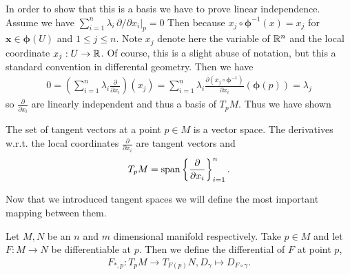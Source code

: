 \documentclass[../master_thesis.tex]{subfiles}
\begin{document}
In order to show that this is a basis we have to prove linear independence.
Assume we have $\sum_{i=1}^n \lambda_i \, \partial/\partial x_i|_p = 0$
Then because $x_j \circ \bm{\phi}^{-1} (x) = x_j$ for $\mathbf{x} \in \bm{\phi}(U)$ and 
$1 \leq j \leq n$. Note $x_j$ denote here the variable of 
$\mathbb{R}^n$ and the local coordinate $x_j:U \rightarrow \mathbb{R}$. Of course, 
this is a slight abuse of notation, but this a standard convention in 
differental geometry.
Then we have 
\begin{align*}
    0 = \left( \sum\limits_{i=1}^n \lambda_i \frac{\partial}{\partial x_i}
        \right) (x_j)
    = \sum\limits_{i=1}^n \lambda_i \frac{\partial (x_j \circ \bm{\phi}^{-1})}{\partial x_i}(\bm{\phi}(p))
    = \lambda_j
\end{align*}
so $\frac{\partial}{\partial x_i}$ are
linearly independent and thus a basis of $T_p M$. Thus we have shown

\begin{proposition}
    The set of tangent vectors at a point $p \in M$ is a vector space. 
    The derivatives w.r.t. the local coordinates $\frac{\partial}{\partial x_i}$ 
    are tangent vectors and 
    \begin{align*}
        T_p M = \operatorname{span} \left\{ \frac{\partial}{\partial x_i} \right\} _{i=1}^n.
    \end{align*}
\end{proposition}

Now that we introduced tangent spaces we will define the most important 
mapping between them.
\begin{definition}[Differential]
    Let $M, N$ be an $n$ and $m$ dimensional manifold respectively. 
    Take $p \in M$ and let $F:M \rightarrow N$ be differentiable at $p$. 
    Then we define the differential of $F$ at point $p$,
    \begin{align*}
        F_{*,p}: T_p M \rightarrow T_{F(p)} N, D_\gamma \mapsto D_{F\circ \gamma}.
    \end{align*}
\end{definition}
\end{document}
